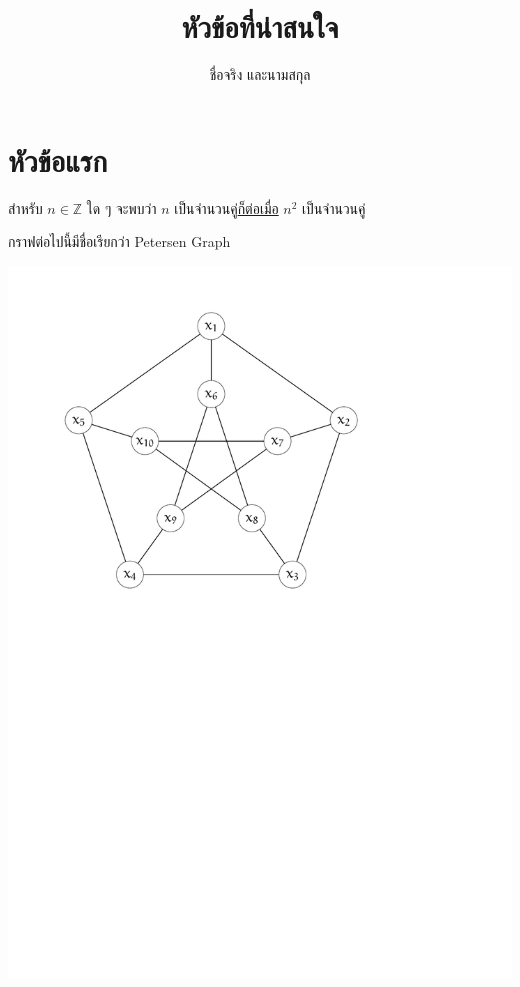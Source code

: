 \documentclass[12pt,a4paper]{article}
\title{หัวข้อที่น่าสนใจ}
\author{ชื่อจริง และนามสกุล}
\date{}
\begin{document}
\maketitle
\thispagestyle{titlepage}

\section*{หัวข้อแรก}

\begin{theorem}
    สำหรับ $n \in \mathbb{Z}$ ใด ๆ จะพบว่า $n$ เป็นจำนวนคู่\hrsp{}\uline{ก็ต่อเมื่อ} $n^2$ เป็นจำนวนคู่ 
\end{theorem}

\begin{definition}
    กราฟต่อไปนี้มีชื่อเรียกว่า Petersen Graph
    \begin{center}
        \includegraphics[page=\ipeFigPetersen,scale=0.8]{diagrams/drawings.pdf}
    \end{center}
\end{definition}
\end{document}
